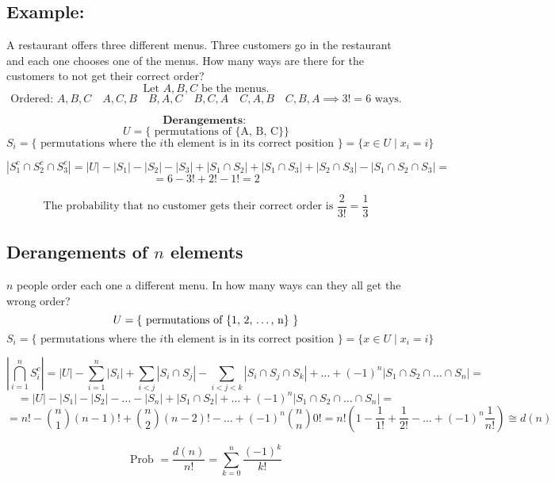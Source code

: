 \documentclass[11pt]{article}
\begin{document}
\subsection*{Example:}
A restaurant offers three different menus. Three customers go in the restaurant and each one chooses one of the menus. How many ways are there for the customers to not get their correct order?
\[
\text{Let } A, B, C \text{ be the menus.}
\]
\[
\text{Ordered: } A, B, C \quad A, C, B \quad B, A, C \quad B, C, A \quad C, A, B \quad C, B, A \implies 3! = 6 \text{ ways.}
\]

\[
\textbf{Derangements: }
\]
\[
U = \{\text{ permutations of \{A, B, C\} }\}
\]
\[
S_i = \{\text{ permutations where the $i$th element is in its correct position }\} = \{x \in U \mid x_i = i\}
\]

\[
\left| S_1^c \cap S_2^c \cap S_3^c \right| = \left| U \right| - \left| S_1 \right| - \left| S_2 \right| - \left| S_3 \right| + \left| S_1 \cap S_2 \right| + \left| S_1 \cap S_3 \right| + \left| S_2 \cap S_3 \right| - \left| S_1 \cap S_2 \cap S_3 \right| = 
\]
\[
= 6 - 3! + 2! - 1! = 2
\]

\[
\text{The probability that no customer gets their correct order is } \frac{2}{3!} = \frac{1}{3}
\]

\subsection{Derangements of $n$ elements}
$n$ people order each one a different menu. In how many ways can they all get the wrong order?
\[
U = \{\text{ permutations of \{1, 2, \dots, n\} }\}
\]
\[
S_i = \{\text{ permutations where the $i$th element is in its correct position }\} = \{x \in U \mid x_i = i\}
\]

\[
\left| \bigcap_{i=1}^{n} S_i^c \right| = \left| U \right| - \sum_{i=1}^{n} \left| S_i \right| + \sum_{i < j} \left| S_i \cap S_j \right| - \sum_{i < j < k} \left| S_i \cap S_j \cap S_k \right| + \dots + (-1)^n \left| S_1 \cap S_2 \cap \dots \cap S_n \right| =
\]
\[
= \left| U \right| - \left| S_1 \right| - \left| S_2 \right| - \dots - \left| S_n \right| + \left| S_1 \cap S_2 \right| + \dots + (-1)^n \left| S_1 \cap S_2 \cap \dots \cap S_n \right| =
\]
\[
= n! - \binom{n}{1} (n - 1)! + \binom{n}{2} (n - 2)! - \dots + (-1)^n \binom{n}{n} 0! = n! \left(1 - \frac{1}{1!} + \frac{1}{2!} - \dots + (-1)^n \frac{1}{n!} \right) \cong d(n)
\]

\[
\text{Prob } = \frac{d(n)}{n!} = \sum_{k=0}^{n} \frac{(-1)^k}{k!}
\]
\end{document}
